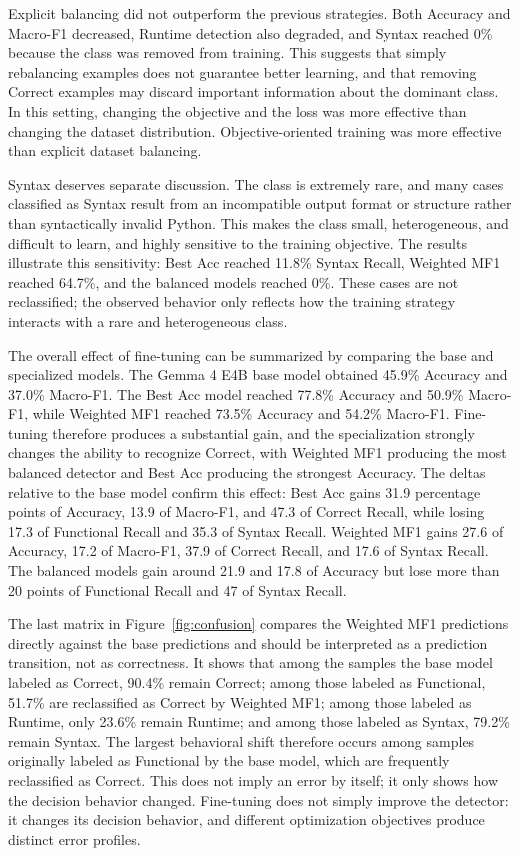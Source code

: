 Explicit balancing did not outperform the previous strategies. Both Accuracy and Macro-F1 decreased, Runtime detection also degraded, and Syntax reached 0\% because the class was removed from training. This suggests that simply rebalancing examples does not guarantee better learning, and that removing Correct examples may discard important information about the dominant class. In this setting, changing the objective and the loss was more effective than changing the dataset distribution. Objective-oriented training was more effective than explicit dataset balancing.

Syntax deserves separate discussion. The class is extremely rare, and many cases classified as Syntax result from an incompatible output format or structure rather than syntactically invalid Python. This makes the class small, heterogeneous, and difficult to learn, and highly sensitive to the training objective. The results illustrate this sensitivity: Best Acc reached 11.8\% Syntax Recall, Weighted MF1 reached 64.7\%, and the balanced models reached 0\%. These cases are not reclassified; the observed behavior only reflects how the training strategy interacts with a rare and heterogeneous class.

The overall effect of fine-tuning can be summarized by comparing the base and specialized models. The Gemma 4 E4B base model obtained 45.9\% Accuracy and 37.0\% Macro-F1. The Best Acc model reached 77.8\% Accuracy and 50.9\% Macro-F1, while Weighted MF1 reached 73.5\% Accuracy and 54.2\% Macro-F1. Fine-tuning therefore produces a substantial gain, and the specialization strongly changes the ability to recognize Correct, with Weighted MF1 producing the most balanced detector and Best Acc producing the strongest Accuracy. The deltas relative to the base model confirm this effect: Best Acc gains 31.9 percentage points of Accuracy, 13.9 of Macro-F1, and 47.3 of Correct Recall, while losing 17.3 of Functional Recall and 35.3 of Syntax Recall. Weighted MF1 gains 27.6 of Accuracy, 17.2 of Macro-F1, 37.9 of Correct Recall, and 17.6 of Syntax Recall. The balanced models gain around 21.9 and 17.8 of Accuracy but lose more than 20 points of Functional Recall and 47 of Syntax Recall.

The last matrix in Figure~\ref{fig:confusion} compares the Weighted MF1 predictions directly against the base predictions and should be interpreted as a prediction transition, not as correctness. It shows that among the samples the base model labeled as Correct, 90.4\% remain Correct; among those labeled as Functional, 51.7\% are reclassified as Correct by Weighted MF1; among those labeled as Runtime, only 23.6\% remain Runtime; and among those labeled as Syntax, 79.2\% remain Syntax. The largest behavioral shift therefore occurs among samples originally labeled as Functional by the base model, which are frequently reclassified as Correct. This does not imply an error by itself; it only shows how the decision behavior changed. Fine-tuning does not simply improve the detector: it changes its decision behavior, and different optimization objectives produce distinct error profiles.

